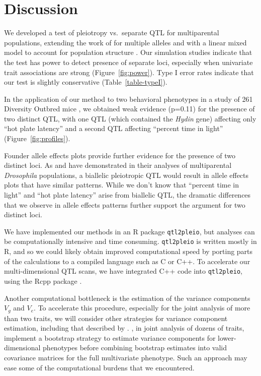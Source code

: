 \documentclass[oneside]{book}\usepackage[]{graphicx}\usepackage[]{color}
\begin{document}
\section{Discussion}

We developed a test of pleiotropy vs.\ separate QTL for multiparental
populations, extending the work of \citet{jiang1995multiple} for
multiple alleles and with a linear mixed model to account for
population structure \citep{kang2010variance, yang2014advantages}. Our simulation
studies indicate that the test has power to detect presence of
separate loci, especially when univariate trait associations are
strong (Figure~\ref{fig:power}). Type I error rates indicate that our
test is slightly conservative (Table~\ref{table-typeI}).

In the application of our method to two behavioral phenotypes in a
study of 261 Diversity Outbred mice
\citep{recla2014precise,logan2013high}, we obtained weak evidence
(p=0.11) for the presence of two distinct QTL, with one QTL (which
contained the \textit{Hydin} gene) affecting only ``hot plate latency'' and a
second QTL affecting ``percent time in light'' (Figure~\ref{fig:profiles}).

Founder allele effects plots provide further evidence for the presence
of two distinct loci. As \citet{macdonald2007joint} and
\citet{king2012genetic} have demonstrated in their analyses of multiparental
\emph{Drosophila} populations, a biallelic pleiotropic QTL would result in
allele effects plots that have similar patterns. While we don't know
that ``percent time in light'' and ``hot plate latency'' arise from
biallelic QTL, the dramatic differences that we observe in allele
effects patterns further support the argument for two distinct loci.

We have implemented our methods in an R package
\texttt{qtl2pleio}, but analyses can be computationally intensive and
time consuming. \texttt{qtl2pleio} is written mostly in R, and so we
could likely obtain improved computational speed by porting parts of
the calculations to a compiled language such as C or C++.
To accelerate our multi-dimensional QTL
scans, we have integrated C++ code into \texttt{qtl2pleio},
using the Rcpp package \citep{eddelbuettel2011rcpp}.

Another computational bottleneck is the estimation of the variance
components $V_g$ and $V_e$. To accelerate this procedure, 
especially for the joint analysis of more than two traits, we will
consider other strategies for variance component estimation, including
that described by \citet{hannah2018limmbo}. \citet{hannah2018limmbo}, in joint analysis of dozens of traits, implement a bootstrap
strategy to estimate variance components for lower-dimensional
phenotypes before combining bootstrap estimates
into valid covariance matrices for the full multivariate phenotype. 
Such an approach may ease some of the computational burdens that we encountered.
\end{document}
